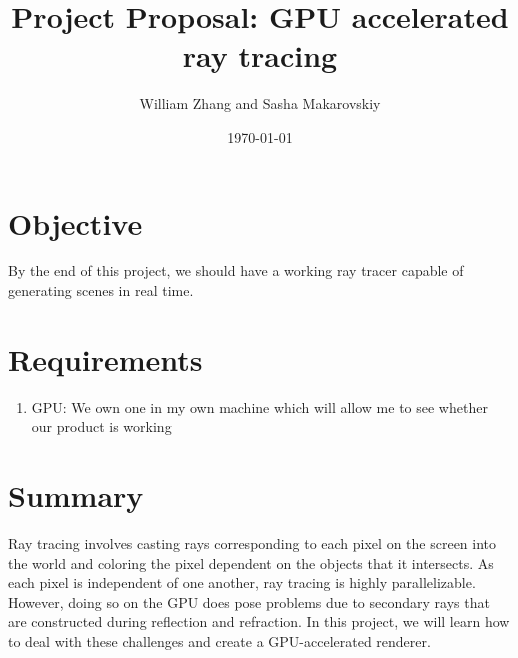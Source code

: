 \documentclass[11pt]{article}
\title{Project Proposal: GPU accelerated ray tracing}
\author{William Zhang and Sasha Makarovskiy}
\date{\today}
\begin{document}
\maketitle
\section{Objective}
By the end of this project, we should have a working ray tracer capable of generating scenes in real time.

\section{Requirements}
\begin{enumerate}
    \item GPU: We own one in my own machine which will allow me to see whether our product is working
\end{enumerate}

\section{Summary}
Ray tracing involves casting rays corresponding to each pixel on the screen into the
world and coloring the pixel dependent on the objects that it intersects. As each pixel
is independent of one another, ray tracing is highly parallelizable. However, doing so
on the GPU does pose problems due to secondary rays that are constructed during reflection
and refraction. In this project, we will learn how to deal with these challenges and create
a GPU-accelerated renderer.
\end{document}
